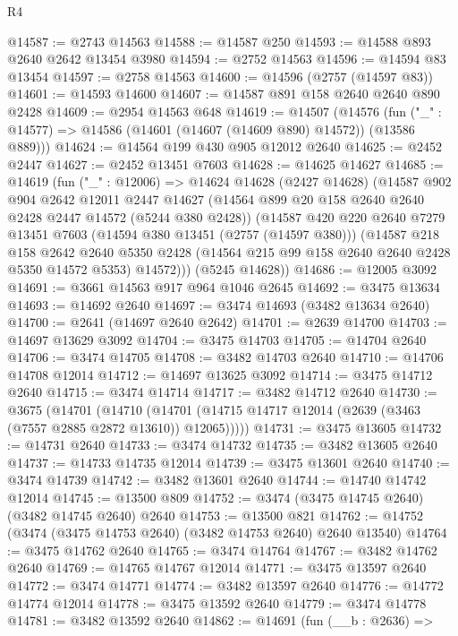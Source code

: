\begin{lexlean}{R4}
\begin{coremodule}
@14587 := @2743 @14563
@14588 := @14587 @250
@14593 := @14588 @893 @2640 @2642 @13454 @3980
@14594 := @2752 @14563
@14596 := @14594 @83 @13454
@14597 := @2758 @14563
@14600 := @14596 (@2757 (@14597 @83))
@14601 := @14593 @14600
@14607 := @14587 @891 @158 @2640 @2640 @890 @2428
@14609 := @2954 @14563 @648
@14619 := @14507
    (@14576 (fun ("_" : @14577) => @14586 (@14601 (@14607 (@14609 @890) @14572)) (@13586 @889)))
@14624 := @14564 @199 @430 @905 @12012 @2640
@14625 := @2452 @2447
@14627 := @2452 @13451 @7603
@14628 := @14625 @14627
@14685 := @14619
    (fun ("_" : @12006) =>
    @14624
      @14628
      (@2427 @14628)
      (@14587
        @902
        @904
        @2642
        @12011
        @2447
        @14627
        (@14564 @899 @20 @158 @2640 @2640 @2428 @2447 @14572 (@5244 @380 @2428))
        (@14587
          @420
          @220
          @2640
          @7279
          @13451
          @7603
          (@14594 @380 @13451 (@2757 (@14597 @380)))
          (@14587
            @218
            @158
            @2642
            @2640
            @5350
            @2428
            (@14564 @215 @99 @158 @2640 @2640 @2428 @5350 @14572 @5353)
            @14572)))
      (@5245 @14628))
@14686 := @12005 @3092
@14691 := @3661 @14563 @917 @964 @1046 @2645
@14692 := @3475 @13634
@14693 := @14692 @2640
@14697 := @3474 @14693 (@3482 @13634 @2640)
@14700 := @2641 (@14697 @2640 @2642)
@14701 := @2639 @14700
@14703 := @14697 @13629 @3092
@14704 := @3475 @14703
@14705 := @14704 @2640
@14706 := @3474 @14705
@14708 := @3482 @14703 @2640
@14710 := @14706 @14708 @12014
@14712 := @14697 @13625 @3092
@14714 := @3475 @14712 @2640
@14715 := @3474 @14714
@14717 := @3482 @14712 @2640
@14730 := @3675
    (@14701
      (@14710 (@14701 (@14715 @14717 @12014 (@2639 (@3463 (@7557 @2885 @2872 @13610)) @12065)))))
@14731 := @3475 @13605
@14732 := @14731 @2640
@14733 := @3474 @14732
@14735 := @3482 @13605 @2640
@14737 := @14733 @14735 @12014
@14739 := @3475 @13601 @2640
@14740 := @3474 @14739
@14742 := @3482 @13601 @2640
@14744 := @14740 @14742 @12014
@14745 := @13500 @809
@14752 := @3474 (@3475 @14745 @2640) (@3482 @14745 @2640) @2640
@14753 := @13500 @821
@14762 := @14752 (@3474 (@3475 @14753 @2640) (@3482 @14753 @2640) @2640 @13540)
@14764 := @3475 @14762 @2640
@14765 := @3474 @14764
@14767 := @3482 @14762 @2640
@14769 := @14765 @14767 @12014
@14771 := @3475 @13597 @2640
@14772 := @3474 @14771
@14774 := @3482 @13597 @2640
@14776 := @14772 @14774 @12014
@14778 := @3475 @13592 @2640
@14779 := @3474 @14778
@14781 := @3482 @13592 @2640
@14862 := @14691
    (fun (__b : @2636) =>

\end{coremodule}
\end{lexlean}
